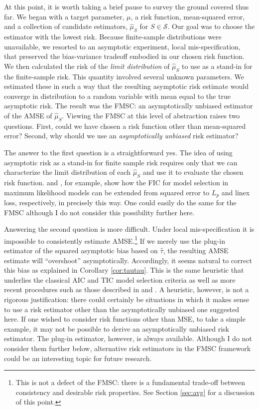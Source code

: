 At this point, it is worth taking a brief pause to survey the ground covered thus far.
We began with a target parameter, $\mu$, a risk function, mean-squared error, and a collection of candidate estimators, $\widehat{\mu}_S$ for $S\in\mathscr{S}$. 
Our goal was to choose the estimator with the lowest risk.
Because finite-sample distributions were unavailable, we resorted to an asymptotic experiment, local mis-specification, that preserved the bias-variance tradeoff embodied in our chosen risk function.
We then calculated the risk of the \emph{limit distribution} of $\widehat{\mu}_S$ to use as a stand-in for the finite-sample risk. 
This quantity involved several unknown parameters.
We estimated these in such a way that the resulting asymptotic risk estimate would converge in distribution to a random variable with mean equal to the true asymptotic risk.
The result was the FMSC: an asymptotically unbiased estimator of the AMSE of $\widehat{\mu}_S$.
Viewing the FMSC at this level of abstraction raises two questions.
First, could we have chosen a risk function other than mean-squared error?
Second, why should we use an \emph{asymptotically unbiased} risk estimator? 

The answer to the first question is a straightforward yes.
The idea of using asymptotic risk as a stand-in for finite sample risk requires only that we can characterize the limit distribution of each $\widehat{\mu}_S$ and use it to evaluate the chosen risk function.
\cite{Claeskens2006} and \cite{ClaeskensHjort2008}, for example, show how the FIC for model selection in maximum likelihood models can be extended from squared error to $L_p$ and linex loss, respectively, in precisely this way.
One could easily do the same for the FMSC although I do not consider this possibility further here.

Answering the second question is more difficult.
Under local mis-specification it is impossible to consistently estimate AMSE.\footnote{This is not a defect of the FMSC: there is a fundamental trade-off between consistency and desirable risk properties. See Section \ref{sec:avg} for a discussion of this point.}
If we merely use the plug-in estimator of the squared asymptotic bias based on $\widehat{\tau}$, the resulting AMSE estimate will ``overshoot'' asymptotically.
Accordingly, it seems natural to correct this bias as explained in Corollary \ref{cor:tautau}.
This is the same heuristic that underlies the classical AIC and TIC model selection criteria as well as more recent procedures such as those described in \cite{ClaeskensHjort2003} and \cite{Schorfheide2005}.
A heuristic, however, is not a rigorous justification: there could certainly be situations in which it makes sense to use a risk estimator other than the asymptotically unbiased one suggested here.
If one wished to consider risk functions other than MSE, to take a simple example, it may not be possible to derive an asymptotically unbiased risk estimator.
The plug-in estimator, however, is always available.
Although I do not consider them further below, alternative risk estimators in the FMSC framework could be an interesting topic for future research.

